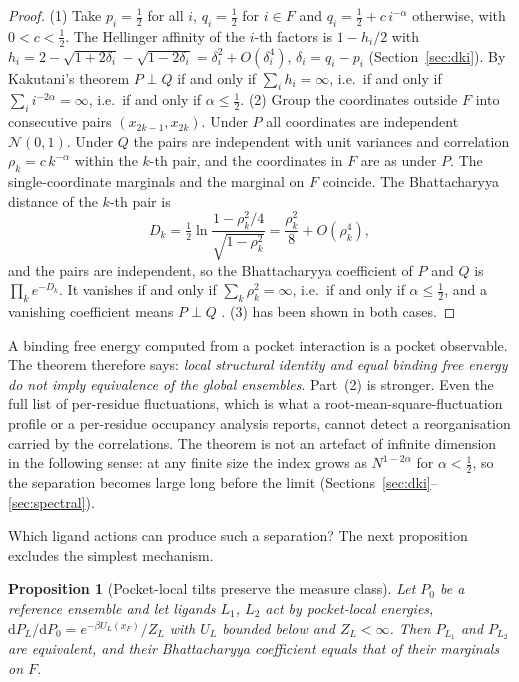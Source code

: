 \documentclass[11pt,reqno]{amsart}
\theoremstyle{plain}
\newtheorem{proposition}[theorem]{Proposition}
\theoremstyle{definition}
\theoremstyle{remark}
\numberwithin{equation}{section}
\newcommand{\dd}{\mathrm{d}}
\begin{document}
\begin{proof}
(1) Take $p_i=\tfrac12$ for all $i$, $q_i=\tfrac12$ for $i\in F$ and $q_i=\tfrac12+c\,i^{-\alpha}$ otherwise, with $0<c<\tfrac12$. The Hellinger affinity of the $i$-th factors is $1-h_i/2$ with $h_i=2-\sqrt{1+2\delta_i}-\sqrt{1-2\delta_i}=\delta_i^2+O(\delta_i^4)$, $\delta_i=q_i-p_i$ (Section~\ref{sec:dki}). By Kakutani's theorem $P\perp Q$ if and only if $\sum_ih_i=\infty$, i.e.\ if and only if $\sum_ii^{-2\alpha}=\infty$, i.e.\ if and only if $\alpha\le\tfrac12$.
(2) Group the coordinates outside $F$ into consecutive pairs $(x_{2k-1},x_{2k})$. Under $P$ all coordinates are independent $\mathcal N(0,1)$. Under $Q$ the pairs are independent with unit variances and correlation $\rho_k=c\,k^{-\alpha}$ within the $k$-th pair, and the coordinates in $F$ are as under $P$. The single-coordinate marginals and the marginal on $F$ coincide. The Bhattacharyya distance of the $k$-th pair is
\[
D_k=\tfrac12\ln\frac{1-\rho_k^2/4}{\sqrt{1-\rho_k^2}}=\frac{\rho_k^2}8+O(\rho_k^4),
\]
and the pairs are independent, so the Bhattacharyya coefficient of $P$ and $Q$ is $\prod_ke^{-D_k}$. It vanishes if and only if $\sum_k\rho_k^2=\infty$, i.e.\ if and only if $\alpha\le\tfrac12$, and a vanishing coefficient means $P\perp Q$ \cite{Kakutani1948}.
(3) has been shown in both cases.
\end{proof}

A binding free energy computed from a pocket interaction is a pocket observable. The theorem therefore says: \emph{local structural identity and equal binding free energy do not imply equivalence of the global ensembles}. Part~(2) is stronger. Even the full list of per-residue fluctuations, which is what a root-mean-square-fluctuation profile or a per-residue occupancy analysis reports, cannot detect a reorganisation carried by the correlations. The theorem is not an artefact of infinite dimension in the following sense: at any finite size the index grows as $N^{1-2\alpha}$ for $\alpha<\tfrac12$, so the separation becomes large long before the limit (Sections~\ref{sec:dki}--\ref{sec:spectral}).

Which ligand actions can produce such a separation? The next proposition excludes the simplest mechanism.

\begin{proposition}[Pocket-local tilts preserve the measure class]\label{prop:tilt}
Let $P_0$ be a reference ensemble and let ligands $L_1$, $L_2$ act by pocket-local energies, $\dd P_{L}/\dd P_0=e^{-\beta U_L(x_F)}/Z_L$ with $U_L$ bounded below and $Z_L<\infty$. Then $P_{L_1}$ and $P_{L_2}$ are equivalent, and their Bhattacharyya coefficient equals that of their marginals on $F$.
\end{proposition}
\end{document}
